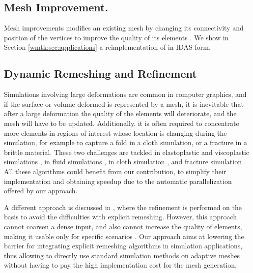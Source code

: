 \subsection{Mesh Improvement.} 

Mesh improvements modifies an existing mesh by changing its connectivity and position of the vertices to improve the quality of its elements \cite{Canann1996,CANANN1993185,Lori1998,Lipman:2012,Chen:2004:ODT,alliez2005variational,feng2018curved,hu2018tetrahedral,Alexa:2019,Klingner07aggressive}.
%
%
We show in Section \ref{wmtk:sec:applications} a reimplementation of \cite{Alexa:2019} in IDAS form.

\subsection{Dynamic Remeshing and Refinement} 

Simulations involving large deformations are common in computer graphics, and if the surface or volume deformed is represented by a mesh, it is inevitable that after a large deformation the quality of the elements will deteriorate, and the mesh will have to be updated. Additionally, it is often required to concentrate more elements in regions of interest whose location is changing during the simulation, for example to capture a fold in a cloth simulation, or a fracture in a brittle material.
%
These two challenges are tackled in elastoplastic and viscoplastic simulations \cite{Hutchinson:1996,Bargteil:2007,Wicke:2010,Wojtan:2008}, in fluid simulations \cite{Misztal:2012,Klingner:2006,Ando:2013,Chentanez:2007,clausen:2013}, in cloth simulation \cite{Villard:2002,Bender:2013,Li:2005,Narain:2012,Narain:2013,Pfaff:2014,Simnett:2009}, and fracture simulation \cite{Busaryev:2013}. All these algorithms could benefit from our contribution, to simplify their implementation and obtaining speedup due to the automatic parallelization offered by our approach.

A different approach is discussed in \cite{Grinspun:2002}, where the refinement is performed on the basis to avoid the difficulties with explicit remeshing. However, this approach cannot coarsen a dense input, and also cannot increase the quality of elements, making it usable only for specific scenarios \cite{Grinspun:2002}. Our approach aims at lowering the barrier for integrating explicit remeshing algorithms in simulation applications, thus allowing to directly use standard simulation methods on adaptive meshes without having to pay the high implementation cost for the mesh generation.

